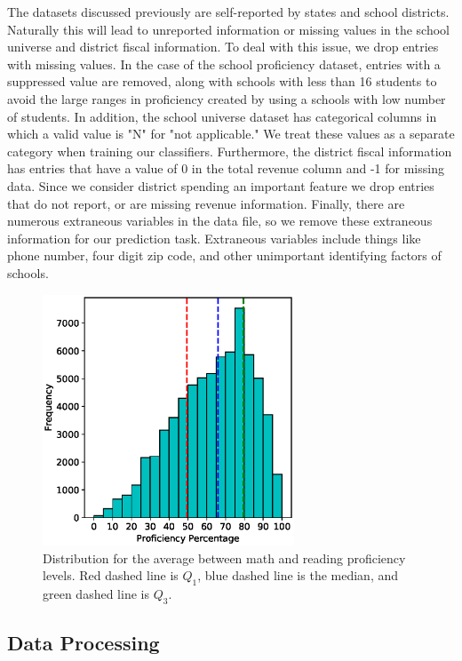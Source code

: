 The datasets discussed previously are self-reported by states and school districts. Naturally this will lead to unreported information or missing values in the school universe and district fiscal information. To deal with this issue, we drop entries with missing values. In the case of the school proficiency dataset, entries with a suppressed value are removed, along with schools with less than 16 students to avoid the large ranges in proficiency created by using a schools with low number of students. In addition, the school universe dataset has categorical columns in which a valid value is "N" for "not applicable." We treat these values as a separate category when training our classifiers. Furthermore, the district fiscal information has entries that have a value of 0 in the total revenue column and -1 for missing data. Since we consider district spending an important feature \cite{spending2015,spending2017} we drop entries that do not report, or are missing revenue information. Finally, there are numerous extraneous variables in the data file, so we remove these extraneous information for our prediction task. Extraneous variables include things like phone number, four digit zip code, and other unimportant identifying factors of schools.

\begin{figure} 
	\includegraphics[width=7.5cm]{images/prof_avg}
	\caption{Distribution for the average between math and reading proficiency levels. Red dashed line is $Q_1$, blue dashed line is the median, and green dashed line is $Q_3$.}
	\label{fig:avgprof}
\end{figure}

\subsection{Data Processing} \label{sec:processing}

